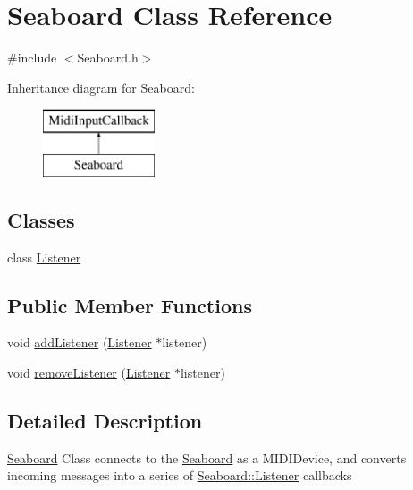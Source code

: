 \hypertarget{class_seaboard}{\section{Seaboard Class Reference}
\label{class_seaboard}
}


{\ttfamily \#include $<$Seaboard.\-h$>$}

Inheritance diagram for Seaboard\-:\begin{figure}[H]
\begin{center}
\leavevmode
\includegraphics[height=2.000000cm]{class_seaboard}
\end{center}
\end{figure}
\subsection*{Classes}
\begin{DoxyCompactItemize}
\item 
class \hyperlink{class_seaboard_1_1_listener}{Listener}
\end{DoxyCompactItemize}
\subsection*{Public Member Functions}
\begin{DoxyCompactItemize}
\item 
void \hyperlink{class_seaboard_a42baffad758f8eda105157b56234c668}{add\-Listener} (\hyperlink{class_seaboard_1_1_listener}{Listener} $\ast$listener)
\item 
void \hyperlink{class_seaboard_ad66eafdd9aa94c203f8634598d74bcaf}{remove\-Listener} (\hyperlink{class_seaboard_1_1_listener}{Listener} $\ast$listener)
\end{DoxyCompactItemize}


\subsection{Detailed Description}
\hyperlink{class_seaboard}{Seaboard} Class connects to the \hyperlink{class_seaboard}{Seaboard} as a M\-I\-D\-I\-Device, and converts incoming messages into a series of \hyperlink{class_seaboard_1_1_listener}{Seaboard\-::\-Listener} callbacks

